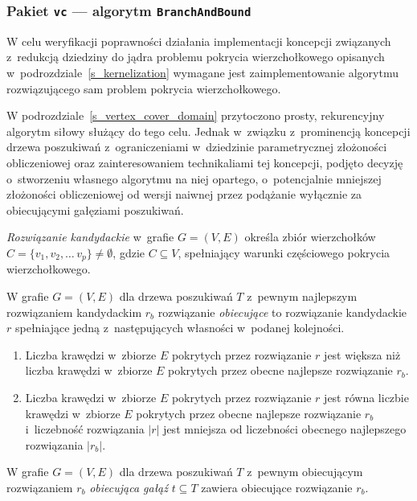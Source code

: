 \subsubsection{\textbf{Pakiet \texttt{vc} --- algorytm \texttt{BranchAndBound}}}
\label{ss_internals_bnb}
\par{
  W celu weryfikacji poprawności działania implementacji koncepcji związanych z~redukcją dziedziny do jądra problemu pokrycia wierzchołkowego opisanych w~podrozdziale~\ref{s_kernelization} wymagane jest zaimplementowanie algorytmu rozwiązującego sam problem pokrycia wierzchołkowego.

  W podrozdziale~\ref{s_vertex_cover_domain} przytoczono prosty, rekurencyjny algorytm siłowy służący do tego celu.
  Jednak w~związku z~prominencją koncepcji drzewa poszukiwań z~ograniczeniami w~dziedzinie parametrycznej złożoności obliczeniowej oraz zainteresowaniem technikaliami tej koncepcji, podjęto decyzję o~stworzeniu własnego algorytmu na niej opartego, o~potencjalnie mniejszej złożoności obliczeniowej od wersji naiwnej przez podążanie wyłącznie za obiecującymi gałęziami poszukiwań.

  \begin{definition}
    \emph{Rozwiązanie kandydackie} w~grafie $G=(V, E)$ określa zbiór wierzchołków $C=\{v_1, v_2, \ldots\, v_p\} \neq \emptyset$, gdzie $C \subseteq V$, spełniający warunki częściowego pokrycia wierzchołkowego.
  \end{definition}
  \begin{definition}
    W grafie $G=(V,E)$ dla drzewa poszukiwań $T$ z~pewnym najlepszym rozwiązaniem kandydackim $r_b$ rozwiązanie \emph{obiecujące} to rozwiązanie kandydackie $r$ spełniające jedną z~następujących własności w~podanej kolejności.
    \begin{enumerate}
      \item Liczba krawędzi w~zbiorze $E$ pokrytych przez rozwiązanie $r$ jest większa niż liczba krawędzi w~zbiorze $E$ pokrytych przez obecne najlepsze rozwiązanie $r_b$.
      \item Liczba krawędzi w~zbiorze $E$ pokrytych przez rozwiązanie $r$ jest równa liczbie krawędzi w~zbiorze $E$ pokrytych przez obecne najlepsze rozwiązanie $r_b$ i~liczebność rozwiązania $|r|$ jest mniejsza od liczebności obecnego najlepszego rozwiązania $|r_b|$.
    \end{enumerate}
  \end{definition}
  \begin{definition}
     W grafie $G=(V, E)$ dla drzewa poszukiwań $T$ z~pewnym obiecującym rozwiązaniem $r_b$ \emph{obiecująca gałąź} $t \subseteq T$ zawiera obiecujące rozwiązanie $r_b$.
  \end{definition}
}
